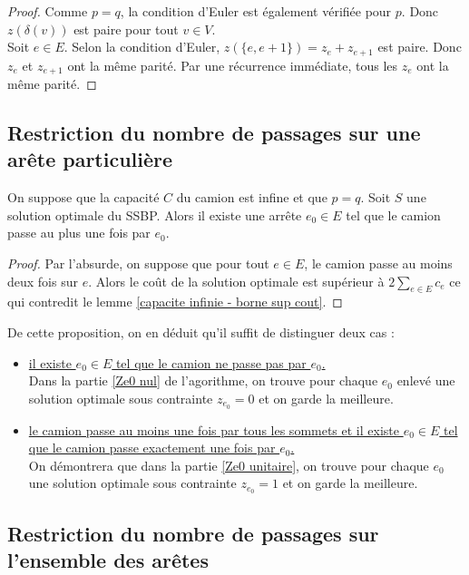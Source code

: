 \begin{proof}
Comme $p=q$, la condition d'Euler est également vérifiée pour $p$. Donc $z(\delta(v))$ est paire pour tout $v \in V$.\\
Soit $e \in E$. Selon la condition d'Euler, $z(\{e, e+1\}) = z_e + z_{e+1}$ est paire. Donc $z_e$ et $z_{e+1}$ ont la même parité. Par une récurrence immédiate, tous les $z_e$ ont la même parité.
\end{proof}

\subsection{Restriction du nombre de passages sur une arête particulière}
\label{e0 nul ou unitaire}

\begin{prop}
On suppose que la capacité $C$ du camion est infine et que $p=q$. Soit $S$ une solution optimale du SSBP. Alors il existe une arrête $e_0 \in E$ tel que le camion passe au plus une fois par $e_0$.
\end{prop}

\begin{proof}
Par l'absurde, on suppose que pour tout $e \in E$, le camion passe au moins deux fois sur $e$. Alors le coût de la solution optimale est supérieur à $2\sum_{e \in E}c_e$ ce qui contredit le lemme \ref{capacite infinie - borne sup cout}.
\end{proof}

De cette proposition, on en déduit qu'il suffit de distinguer deux cas :
\begin{itemize}
\item \uline{il existe $e_0 \in E$ tel que le camion ne passe pas par $e_0$.}\\
Dans la partie \ref{Ze0 nul} de l'agorithme, on trouve pour chaque $e_0$ enlevé une solution optimale sous contrainte $z_{e_0} = 0$ et on garde la meilleure.
\item \uline{le camion passe au moins une fois par tous les sommets et il existe $e_0 \in E$ tel que le camion passe exactement une fois par $e_0$.}\\
On démontrera que dans la partie \ref{Ze0 unitaire}, on trouve pour chaque $e_0$ une solution optimale sous contrainte $z_{e_0} = 1$ et on garde la meilleure.
\end{itemize}

\subsection{Restriction du nombre de passages sur l'ensemble des arêtes}
\label{restriction arête}

